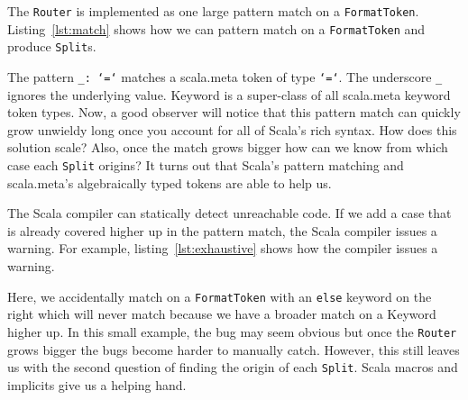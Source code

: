 The \texttt{Router} is implemented as one large pattern match on a \texttt{FormatToken}.
Listing~\ref{lst:match} shows how we can pattern match on a \texttt{FormatToken} and produce \texttt{Split}s.
\begin{minipage}{\linewidth}
  
\end{minipage}
The pattern \texttt{\_: `=`} matches a scala.meta token of type \texttt{`=`}.
The underscore \texttt{\_} ignores the underlying value.
Keyword is a super-class of all scala.meta keyword token types.
Now, a good observer will notice that this pattern match can quickly grow unwieldy long once you account for all of Scala's rich syntax.
How does this solution scale?
Also, once the match grows bigger how can we know from which case each \texttt{Split} origins?
It turns out that Scala's pattern matching and scala.meta's algebraically typed tokens are able to help us.

The Scala compiler can statically detect unreachable code.
If we add a case that is already covered higher up in the pattern match, the Scala compiler issues a warning.
For example, listing~\ref{lst:exhaustive} shows how the compiler issues a warning.
\begin{minipage}{\linewidth}
  
\end{minipage}
Here, we accidentally match on a \texttt{FormatToken} with an \texttt{else} keyword on the right which will never match because we have a broader match on a Keyword higher up.
In this small example, the bug may seem obvious but once the \texttt{Router} grows bigger the bugs become harder to manually catch.
However, this still leaves us with the second question of finding the origin of each \texttt{Split}.
Scala macros\autocite{burmako2013scala} and implicits\autocite{oliveira2010type} give us a helping hand.

